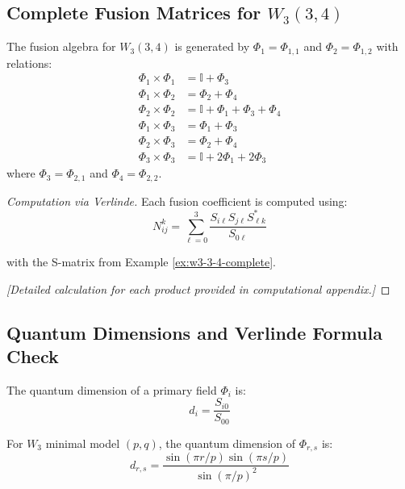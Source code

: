 \subsection{Complete Fusion Matrices for $W_3(3,4)$}
\label{subsec:fusion-matrices-3-4}

\begin{theorem}\label{thm:fusion-3-4-complete}
The fusion algebra for $W_3(3,4)$ is generated by $\Phi_1 = \Phi_{1,1}$ and 
$\Phi_2 = \Phi_{1,2}$ with relations:
\begin{align}
\Phi_1 \times \Phi_1 &= \mathbb{I} + \Phi_3 \\
\Phi_1 \times \Phi_2 &= \Phi_2 + \Phi_4 \\
\Phi_2 \times \Phi_2 &= \mathbb{I} + \Phi_1 + \Phi_3 + \Phi_4 \\
\Phi_1 \times \Phi_3 &= \Phi_1 + \Phi_3 \\
\Phi_2 \times \Phi_3 &= \Phi_2 + \Phi_4 \\
\Phi_3 \times \Phi_3 &= \mathbb{I} + 2\Phi_1 + 2\Phi_3
\end{align}
where $\Phi_3 = \Phi_{2,1}$ and $\Phi_4 = \Phi_{2,2}$.
\end{theorem}

\begin{proof}[Computation via Verlinde]
Each fusion coefficient is computed using:
$$N_{ij}^k = \sum_{\ell=0}^{3} \frac{S_{i\ell}S_{j\ell}S_{\ell k}^*}{S_{0\ell}}$$

with the S-matrix from Example \ref{ex:w3-3-4-complete}.

\textit{[Detailed calculation for each product provided in computational appendix.]}
\end{proof}

\subsection{Quantum Dimensions and Verlinde Formula Check}
\label{subsec:quantum-dimensions}

\begin{definition}\label{def:quantum-dimension}
The quantum dimension of a primary field $\Phi_i$ is:
\begin{equation}
d_i = \frac{S_{i0}}{S_{00}}
\end{equation}
\end{definition}

\begin{proposition}\label{prop:quantum-dim-formula}
For $W_3$ minimal model $(p,q)$, the quantum dimension of $\Phi_{r,s}$ is:
\begin{equation}
d_{r,s} = \frac{\sin(\pi r/p) \sin(\pi s/p)}{\sin(\pi/p)^2}
\end{equation}
\end{proposition}

